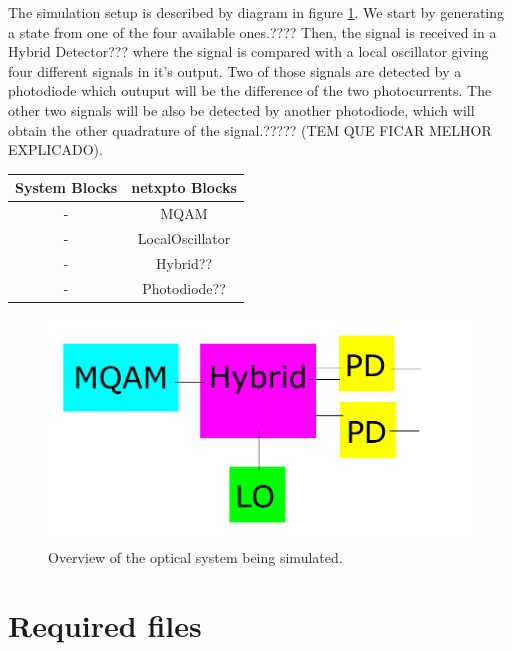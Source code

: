 \documentclass[a4paper]{article}
\begin{document}
The simulation setup is described by diagram in figure \ref{fig:setup}. We start by generating a state from one of the four available ones.???? Then, the signal is received in a Hybrid Detector??? where the signal is compared with a local oscillator giving four different signals in it's output. Two of those signals are detected by a photodiode which outuput will be the difference of the two photocurrents. The other two signals will be also be detected by another photodiode, which will obtain the other quadrature of the signal.????? (TEM QUE FICAR MELHOR EXPLICADO).



\begin{table}[H]
\centering
\begin{tabular}{c|c}
System Blocks          & netxpto Blocks       \\ \hline
- & MQAM \\
- & LocalOscillator \\
- & Hybrid?? \\
- & Photodiode??
\end{tabular}
\end{table}


\begin{figure}[h]
\centering
\includegraphics[width=\linewidth]{../img/scheme1.pdf}
\caption{Overview of the optical system being simulated.}
\label{fig:setup}
\end{figure}


\section{Required files}\label{Required files}
\end{document}

